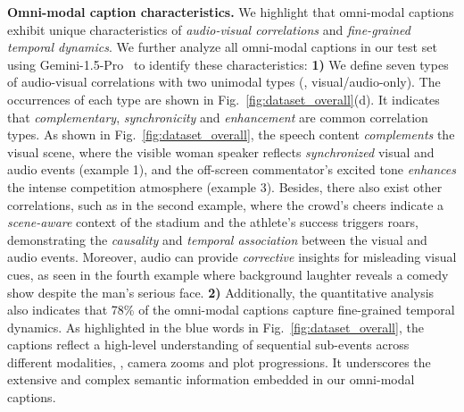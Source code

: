 \noindent \textbf{Omni-modal caption characteristics.}
We highlight that omni-modal captions exhibit unique characteristics of \textit{audio-visual correlations} and \textit{fine-grained temporal dynamics}.
We further analyze all omni-modal captions in our test set using Gemini-1.5-Pro~\cite{Gemini} to identify these characteristics:
\textbf{1)} We define seven types of audio-visual correlations with two unimodal types (\ie, visual/audio-only). 
The occurrences of each type are shown in Fig.~\ref{fig:dataset_overall}(d).
It indicates that \textit{complementary}, \textit{synchronicity} and \textit{enhancement} are common correlation types. 
As shown in Fig.~\ref{fig:dataset_overall}, the speech content \textit{complements} the visual scene, where the visible woman speaker reflects \textit{synchronized} visual and audio events (example 1), and the off-screen commentator's excited tone \textit{enhances} the intense competition atmosphere (example 3).
Besides, there also exist other correlations, such as in the second example, where the crowd's cheers indicate a \textit{scene-aware} context of the stadium and the athlete's success triggers roars, demonstrating the \textit{causality} and \textit{temporal association} between the visual and audio events. 
Moreover, audio can provide \textit{corrective} insights for misleading visual cues, as seen in the fourth example where background laughter reveals a comedy show despite the man's serious face.
\textbf{2)} Additionally, the quantitative analysis also indicates that 78\% of the omni-modal captions capture fine-grained temporal dynamics. As highlighted in the blue words in Fig.~\ref{fig:dataset_overall}, the captions reflect a high-level understanding of sequential sub-events across different modalities, \eg, camera zooms and plot progressions. 
It underscores the extensive and complex semantic information embedded in our omni-modal captions.


